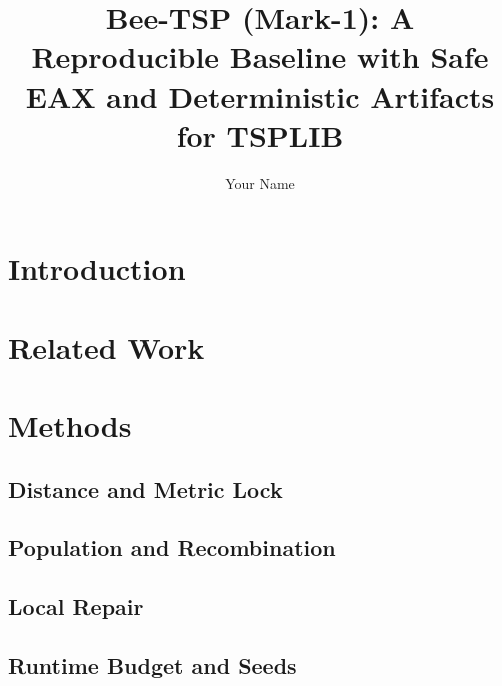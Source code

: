 \documentclass[11pt]{article}
\title{Bee-TSP (Mark-1): A Reproducible Baseline with Safe EAX and Deterministic Artifacts for TSPLIB}
\author[1]{Your Name}
\affil[1]{Affiliation}
\date{}
\begin{document}
\maketitle

\begin{abstract}
\end{abstract}

\section{Introduction}

\section{Related Work}

\section{Methods}
\subsection{Distance and Metric Lock}

\subsection{Population and Recombination}

\subsection{Local Repair}

\subsection{Runtime Budget and Seeds}
\end{document}
